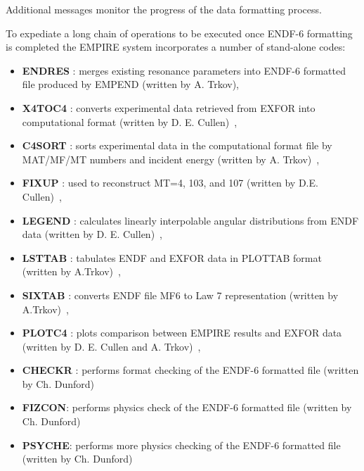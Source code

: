 Additional messages monitor the progress of the data formatting process.

To expediate a long chain of operations to be executed once ENDF-6
formatting is completed the EMPIRE system incorporates a number of
stand-alone codes:

\begin{itemize}
\item \textbf{ENDRES%
}: merges existing resonance parameters into ENDF-6 formatted
file produced by EMPEND (written by A. Trkov),

\item \textbf{X4TOC4%
}: converts experimental data retrieved from EXFOR into
computational format (written by D. E. Cullen)~\cite{PREPRO},

\item \textbf{C4SORT%
}: sorts experimental data in the computational format file by
MAT/MF/MT numbers and incident energy (written by A. Trkov)~\cite{ENDVER},

\item \textbf{FIXUP%
}: used to reconstruct MT=4, 103, and 107 (written by D.E.
Cullen)~\cite{PREPRO},

\item \textbf{LEGEND%
}: calculates linearly interpolable angular distributions from
ENDF data (written by D. E. Cullen)~\cite{PREPRO},

\item \textbf{LSTTAB%
}: tabulates ENDF and EXFOR data in PLOTTAB format (written by
A.Trkov)~\cite{ENDVER},

\item \textbf{SIXTAB%
}: converts ENDF file MF6 to Law 7 representation (written by
A.Trkov)~\cite{ENDVER},

\item \textbf{PLOTC4%
}: plots comparison between EMPIRE results and EXFOR data
(written by D. E. Cullen and A. Trkov)~\cite{ENDVER},

\item \textbf{CHECKR%
}: performs format checking of the ENDF-6 formatted file
(written by Ch. Dunford)

\item \textbf{FIZCON}: performs physics check of the ENDF-6 formatted file
(written by Ch. Dunford)

\item \textbf{PSYCHE}: performs more physics checking of the ENDF-6
formatted file (written by Ch. Dunford)


\end{itemize}
